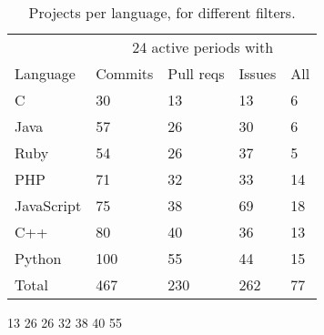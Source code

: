 

\begin{table}[t]
	\centering
	\caption{Projects per language, for different filters.}
	\vspace{-0.2cm}
	\label{projs_summary}
	\begin{tabular}{ p{1.2cm} p{1cm} p{1cm} p{1cm} p{0.7cm} }
	\hline
	& \multicolumn{4}{c}{24 active periods with}   \\
	Language   &  Commits   & Pull reqs     & Issues       & All        \\ \hline
	C 		& 30 		& 13 		& 13	 	& 6 \\
	Java 	& 57        	& 26        	& 30      	& 6    \\
	Ruby    	& 54          & 26       	& 37      	& 5      \\
	PHP    	& 71          & 32        	& 33      	& 14       \\
	JavaScript  & 75        & 38        	& 69       	& 18     \\
	C++   	& 80          & 40        	& 36      	& 13      \\
	Python      & 100        & 55        	& 44      	& 15       \\ \hline
	Total 	& 467	& 230	& 262	& 77 \\ \hline
\end{tabular}
\end{table}

13         26         26         32         38         40         55

%	
%	
%


